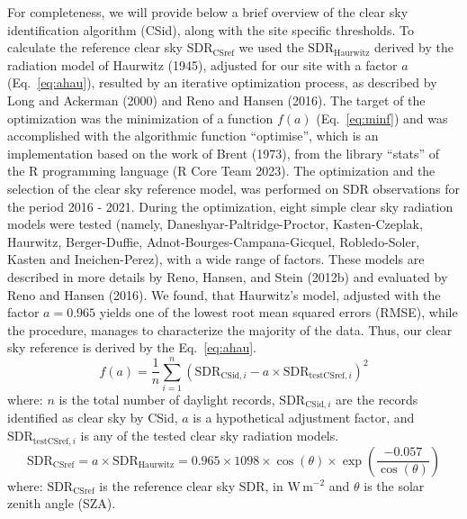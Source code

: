 \documentclass[
  preprint, 3p, authoryear]{article}
\begin{document}
For completeness, we will provide below a brief overview of the clear sky identification algorithm (CSid), along with the site specific thresholds.
To calculate the reference clear sky \(\text{SDR}_\text{CSref}\) we used the \(\text{SDR}_\text{Haurwitz}\) derived by the radiation model of Haurwitz (1945), adjusted for our site with a factor \(a\) (Eq.~\ref{eq:ahau}), resulted by an iterative optimization process, as described by Long and Ackerman (2000) and Reno and Hansen (2016).
The target of the optimization was the minimization of a function \(f(a)\) (Eq.~\ref{eq:minf}) and was accomplished with the algorithmic function ``optimise'', which is an implementation based on the work of Brent (1973), from the library ``stats'' of the R programming language (R Core Team 2023).
The optimization and the selection of the clear sky reference model, was performed on SDR observations for the period 2016 - 2021.
During the optimization, eight simple clear sky radiation models were tested (namely, Daneshyar-Paltridge-Proctor, Kasten-Czeplak, Haurwitz, Berger-Duffie, Adnot-Bourges-Campana-Gicquel, Robledo-Soler, Kasten and Ineichen-Perez), with a wide range of factors.
These models are described in more details by Reno, Hansen, and Stein (2012b) and evaluated by Reno and Hansen (2016).
We found, that Haurwitz's model, adjusted with the factor \(a = 0.965\) yields one of the lowest root mean squared errors (RMSE), while the procedure, manages to characterize the majority of the data.
Thus, our clear sky reference is derived by the Eq.~\ref{eq:ahau}.
\begin{equation}
f(a) = \frac{1}{n}\sum_{i=1}^{n} ( \text{SDR}_{\text{CSid},i} - a \times \text{SDR}_{\text{testCSref},i} )^2 \label{eq:minf}
\end{equation}
where: \(n\) is the total number of daylight records, \(\text{SDR}_{\text{CSid},i}\) are the records identified as clear sky by CSid, \(a\) is a hypothetical adjustment factor, and \(\text{SDR}_{\text{testCSref},i}\) is any of the tested clear sky radiation models.
\begin{equation}
\text{SDR}_\text{CSref} = a \times \text{SDR}_\text{Haurwitz} = 0.965 \times 1098 \times \cos(\theta) \times \exp \left( \frac{ - 0.057}{\cos(\theta)} \right) \label{eq:ahau}
\end{equation}
where: \(\text{SDR}_\text{CSref}\) is the reference clear sky SDR, in \(\text{W}\,\text{m}^{-2}\) and \(\theta\) is the solar zenith angle (SZA).
\end{document}
